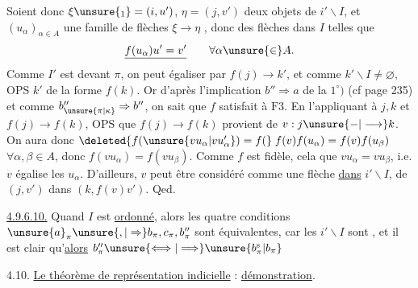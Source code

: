 Soient donc $\xi\unsure{_{1}}=(i,u')$, $\eta=(j,v')$ deux objets de $i'\backslash I$, et $(u_{\alpha})_{\alpha\in A}$ une famille de flèches $\xi\longrightarrow\eta$ , donc des flèches dans $I$ telles que
\[
 \underline{f(u_{\alpha})u'=v'}\qquad\forall\alpha\unsure{\in}A.
\]
Comme $I'$ est  devant $\pi$, on peut égaliser par $f(j)\longrightarrow k'$, et comme  $k'\backslash I\ne\varnothing$, OPS $k'$ de la forme $f(k)$. Or
d'après l'implication $b''\Rightarrow a$ de la  $1^\circ)$ (cf page 235) et comme $b''_{\unsure{\pi|\kappa}}\Rightarrow b''$, on sait   que $f$ satisfait à $\mathrm{F}3$.
En l'appliquant à $j,k$ et $f(j)\longrightarrow f(k)$, OPS que $f(j)\longrightarrow f(k)$ provient de $v:j\unsure{\mathbin{-}|\longrightarrow}k$. On aura donc $\deleted{f(\unsure{vu_{\alpha}|vu'_{\alpha}})=f(}\; f(v)f(u_{\alpha})=f(v)f(u_{\beta})$ $\forall\alpha,\beta\in A$, donc $f(vu_{\alpha})=f(vu_{\beta})$.
Comme $f$ est fidèle, cela  que $vu_{\alpha}=vu_{\beta}$, i.e. $v$ égalise les $u_{\alpha}$. D'ailleurs, $v$ peut être considéré comme une flèche \uline{dans} $i'\backslash I$, de $(j,v')$ dans $(k,f(v)v')$. Qed.

\uline{4.9.6.10.} Quand $I$ est \uline{ordonné}, alors les quatre conditions $\unsure{a}_{\pi}\unsure{,|\Rightarrow}b_{\pi},c_{\pi},b''_{\pi}$ sont équivalentes, car les $i'\backslash I$ sont , et il est clair qu'\uline{alors} $b''_{\pi}\unsure{\Longleftrightarrow|\Longrightarrow}\unsure{b^{\mathrm{s}}_{\pi}|b_{\pi}}$

4.10. \uline{Le théorème de représentation indicielle} : \uline{démonstration}.

